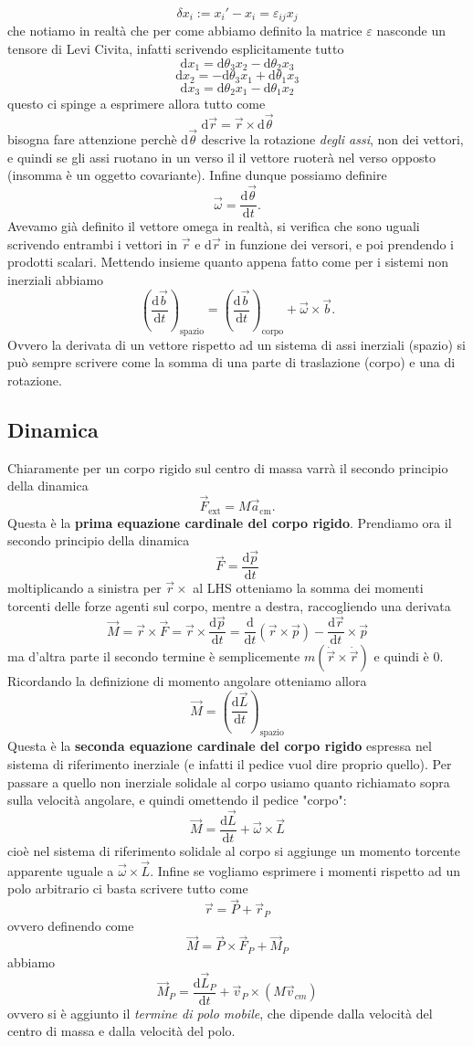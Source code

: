 \documentclass[11pt]{scrartcl}
\newcommand{\dif}{\text{d}}
\newcommand{\posit}{\vec{r}}
\newcommand{\veloc}{\dot{\vec{r}}}
\begin{document}
	$$\delta x_i:=x_i'-x_i=\varepsilon_{ij}x_j$$
	che notiamo in realtà che per come abbiamo definito la matrice $\varepsilon$ nasconde un tensore di Levi Civita, infatti scrivendo esplicitamente tutto
	$$\dif x_1=\dif \theta_3 x_2 -\dif\theta_2 x_3$$
	$$\dif x_2=-\dif \theta_3 x_1 +\dif\theta_1 x_3$$
	$$\dif x_3=\dif \theta_2 x_1 -\dif\theta_1 x_2$$
	questo ci spinge a esprimere allora tutto come
	$$\dif \vec{r}=\vec{r}\times \dif\vec{\theta}$$
	bisogna fare attenzione perchè $\dif \vec{\theta}$ descrive la rotazione \textit{degli assi}, non dei vettori, e quindi se gli assi ruotano in un verso il il vettore ruoterà nel verso opposto (insomma è un oggetto covariante). Infine dunque possiamo definire
	$$\vec{\omega}=\frac{\dif \vec{\theta}}{\dif t}.$$ 
	Avevamo già definito il vettore omega in realtà, si verifica che sono uguali scrivendo entrambi i vettori in $\vec{r}$ e $\dif\vec{r}$ in funzione dei versori, e poi prendendo i prodotti scalari. Mettendo insieme quanto appena fatto come per i sistemi non inerziali abbiamo
	$$\left(\frac{\dif \vec{b}}{\dif t}\right)_{\text{spazio}}=\left(\frac{\dif \vec{b}}{\dif t}\right)_{\text{corpo}}+\vec{\omega}\times \vec{b}.$$
	Ovvero la derivata di un vettore rispetto ad un sistema di assi inerziali (spazio) si può sempre scrivere come la somma di una parte di traslazione (corpo) e una di rotazione. 
	\subsection{Dinamica}
	Chiaramente per un corpo rigido sul centro di massa varrà il secondo principio della dinamica
	$$\vec{F}_{\text{ext}}=M\vec{a}_{\text{cm}}.$$
	Questa è la \textbf{prima equazione cardinale del corpo rigido}. Prendiamo ora il secondo principio della dinamica
	$$\vec{F}=\frac{\dif \vec{p}}{\dif t}$$
	moltiplicando a sinistra per $\posit\times $ al LHS otteniamo la somma dei momenti torcenti delle forze agenti sul corpo, mentre a destra, raccogliendo una derivata
	$$\vec{M}=\posit\times \vec{F}=\posit\times \frac{\dif \vec{p}}{\dif t}=\frac{\dif }{\dif t}\left(\posit\times \vec{p}\right)-\frac{\dif \posit}{\dif t}\times \vec{p}$$
	ma d'altra parte il secondo termine è semplicemente $m(\veloc\times\veloc)$ e quindi è $0$. Ricordando la definizione di momento angolare otteniamo allora
	$$\vec{M}=\left(\frac{\dif \vec{L}}{\dif t}\right)_{\text{spazio}}$$
	Questa è la \textbf{seconda equazione cardinale del corpo rigido} espressa nel sistema di riferimento inerziale (e infatti il pedice vuol dire proprio quello). Per passare a quello non inerziale solidale al corpo usiamo quanto richiamato sopra sulla velocità angolare, e quindi omettendo il pedice "corpo":
	$$\vec{M}=\frac{\dif \vec{L}}{\dif t}+\vec{\omega}\times\vec{L}$$
	cioè nel sistema di riferimento solidale al corpo si aggiunge un momento torcente apparente uguale a $\vec{\omega}\times \vec{L}$. Infine se vogliamo esprimere i momenti rispetto ad un polo arbitrario ci basta scrivere tutto come 
	$$\posit=\vec{P}+\vec{r}_P$$
	ovvero definendo come
	$$\vec{M}=\vec{P}\times \vec{F}_P+\vec{M}_P$$
	abbiamo
	$$\vec{M}_P=\frac{\dif \vec{L}_P}{\dif t}+\vec{v}_P\times \left(M\vec{v}_{cm}\right)$$
	ovvero si è aggiunto il \textit{termine di polo mobile}, che dipende dalla velocità del centro di massa e dalla velocità del polo. 
\end{document}
